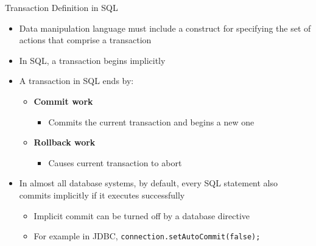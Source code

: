 \documentclass[aspectratio=169, xcolor=dvipsnames]{beamer}
\begin{document}
\begin{frame}{Transaction Definition in SQL}
    \begin{itemize}[<+->]
        \item Data manipulation language must include a construct for specifying the set of actions that comprise a transaction
        \item In SQL, a transaction begins implicitly
        \item A transaction in SQL ends by:
        \begin{itemize}
            \item \textbf{Commit work}
            \begin{itemize}
                \item[$\triangleright$] Commits the current transaction and begins a new one
            \end{itemize}
            \item \textbf{Rollback work}
            \begin{itemize}
                \item[$\triangleright$] Causes current transaction to abort
            \end{itemize}
        \end{itemize}
        \item In almost all database systems, by default, every SQL statement also commits implicitly if it executes successfully
        \begin{itemize}
            \item[$\triangleright$] Implicit commit can be turned off by a database directive
            \item[$\triangleright$] For example in JDBC, \texttt{connection.setAutoCommit(false);}
        \end{itemize}
    \end{itemize}
\end{frame}
\end{document}

